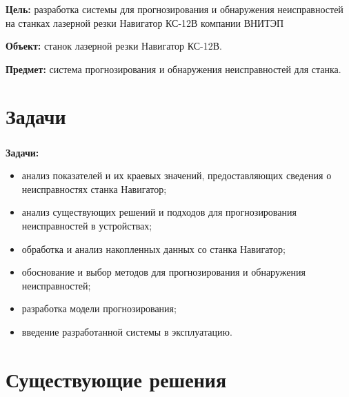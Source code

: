 \begin{frame}
\frametitle{\insertsection}

\textbf{Цель:} разработка системы для прогнозирования и обнаружения неисправностей
на станках лазерной резки Навигатор КС-12В компании ВНИТЭП

\vspace{\baselineskip}

\textbf{Объект:} станок лазерной резки Навигатор КС-12В.

\vspace{\baselineskip}

\textbf{Предмет:} система прогнозирования и обнаружения неисправностей для станка.

\end{frame}



\section{Задачи}

\begin{frame}
\frametitle{\insertsection}

\textbf{Задачи:}
\begin{itemize}
    \item анализ показателей и их краевых значений, предоставляющих сведения о неисправностях станка Навигатор;
    \item анализ существующих решений и подходов для прогнозирования неисправностей в устройствах;
    \item обработка и анализ накопленных данных со станка Навигатор;
    \item обоснование и выбор методов для прогнозирования и обнаружения неисправностей;
    \item разработка модели прогнозирования;
    \item введение разработанной системы в эксплуатацию.
\end{itemize}

\end{frame}


\section{Существующие решения}

